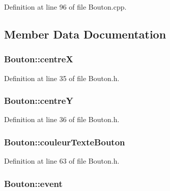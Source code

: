 Definition at line 96 of file Bouton.\+cpp.



\subsection{Member Data Documentation}
\hypertarget{class_bouton_a01ce5478093e65e588cce2dbf94333cc}{}
\subsubsection[{centre\+X}]{ Bouton\+::centre\+X}\label{class_bouton_a01ce5478093e65e588cce2dbf94333cc}


Definition at line 35 of file Bouton.\+h.

\hypertarget{class_bouton_ae511256fd074ca6df053b4700ab02101}{}
\subsubsection[{centre\+Y}]{ Bouton\+::centre\+Y}\label{class_bouton_ae511256fd074ca6df053b4700ab02101}


Definition at line 36 of file Bouton.\+h.

\hypertarget{class_bouton_a5dad2b0d5113cca14a1449ca3ec1668d}{}
\subsubsection[{couleur\+Texte\+Bouton}]{ Bouton\+::couleur\+Texte\+Bouton}\label{class_bouton_a5dad2b0d5113cca14a1449ca3ec1668d}


Definition at line 63 of file Bouton.\+h.

\hypertarget{class_bouton_a499f5c9de8eea03c8194eb3ecf4b7c00}{}
\subsubsection[{event}]{ Bouton\+::event}\label{class_bouton_a499f5c9de8eea03c8194eb3ecf4b7c00}


